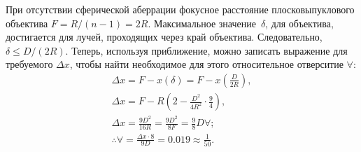 При отсутствии сферической аберрации фокусное расстояние плосковыпуклового объектива $F = R/(n-1) = 2R$. Максимальное значение~$\delta$, для объектива, достигается для лучей, проходящих через край объектива. Следовательно, $\delta \leqslant D/(2R)$. Теперь, используя приближение, можно записать выражение для требуемого $\Delta x$, чтобы найти необходимое для этого относительное отверситие $\forall$:
\begin{gather*}
    \Delta x = F - x(\delta) = F - x\left( \frac{D}{2R} \right),\\
    \Delta x = F - R\left( 2 - \frac{D^2}{4R^2} \cdot \frac{9}{4} \right),\\
    \Delta x = \frac{9D^2}{16R} = \frac{9D^2}{8F} = \frac{9}{8} D \forall;\\
    \therefore \forall = \frac{\Delta x \cdot 8}{9D} = 0.019 \approx \frac{1}{50}.
\end{gather*}

